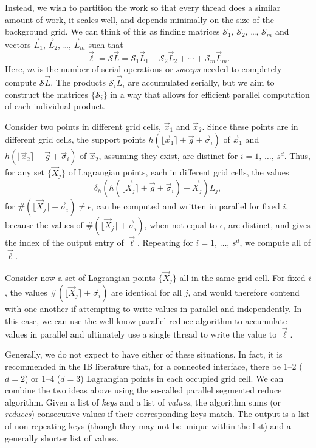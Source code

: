Instead, we wish to partition the work so that every thread does a similar
amount of work, it scales well, and depends minimally on the size of the
background grid. We can think of this as finding matrices $\mathcal{S}_1$,
$\mathcal{S}_2$, \dots, $\mathcal{S}_m$ and vectors $\vec{L}_1$, $\vec{L}_2$,
\dots, $\vec{L}_m$ such that
\begin{equation*}
    \vec{\ell} = \mathcal{S}\vec{L} = \mathcal{S}_1\vec{L}_1 + \mathcal{S}_2\vec{L}_2 + \cdots + \mathcal{S}_m\vec{L}_m.
\end{equation*}
Here, $m$ is the number of serial operations or \emph{sweeps} needed to
completely compute $\mathcal{S}\vec{L}$. The products $\mathcal{S}_i\vec{L}_i$
are accumulated serially, but we aim to construct the matrices
$\{\mathcal{S}_i\}$ in a way that allows for efficient parallel computation of
each individual product.

Consider two points in different grid cells, $\vec{x}_1$ and $\vec{x}_2$. Since
these points are in different grid cells, the support points
$h(\lfloor\vec{x}_1\rceil+\vec{g}+\vec{\sigma}_i)$ of $\vec{x}_1$ and 
$h(\lfloor\vec{x}_2\rceil+\vec{g}+\vec{\sigma}_i)$ of $\vec{x}_2$, assuming
they exist, are distinct for $i=1,\,\ldots,\,s^d$. Thus, for any set
$\{\vec{X}_j\}$ of Lagrangian points, each in different grid cells, the values
\begin{equation*}
    \delta_h(h(\lfloor\vec{X}_j\rceil + \vec{g}+\vec{\sigma}_i)-\vec{X}_j)L_j,
\end{equation*}
for $\#(\lfloor\vec{X}_j\rceil+\vec{\sigma}_i)\neq\epsilon$, can be computed
and written in parallel for fixed $i$, because the values of
$\#(\lfloor\vec{X}_j\rceil+\vec{\sigma}_i)$, when not equal to $\epsilon$, are
distinct, and gives the index of the output entry of $\vec{\ell}$.
Repeating for $i=1,\,\ldots,\,s^d$, we compute all of $\vec{\ell}$.

Consider now a set of Lagrangian points $\{\vec{X}_j\}$ all in the same grid
cell. For fixed $i$, the values $\#(\lfloor\vec{X}_j\rceil+\vec{\sigma}_i)$ are
identical for all $j$, and would therefore contend with one another if
attempting to write values in parallel and independently. In this case, we
can use the well-know parallel reduce algorithm to accumulate values in
parallel and ultimately use a single thread to write the value to $\vec{\ell}$.

Generally, we do not expect to have either of these situations. In fact, it is
recommended in the IB literature that, for a connected interface, there be
1--2 ($d=2$) or 1--4 ($d=3$) Lagrangian points in each occupied grid cell. We
can combine the two ideas above using the so-called parallel segmented reduce
algorithm. Given a list of \emph{keys} and a list of \emph{values}, the
algorithm sums (or \emph{reduces}) consecutive values if their corresponding
keys match. The output is a list of non-repeating keys (though they may not be
unique within the list) and a generally shorter list of values.

